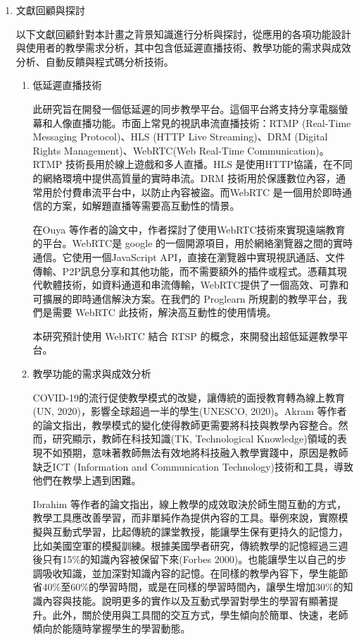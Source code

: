 \documentclass[12pt]{article}
\begin{document}
\begin{enumerate}
  \item 文獻回顧與探討
    \par 以下文獻回顧針對本計畫之背景知識進行分析與探討，從應用的各項功能設計與使用者的教學需求分析，其中包含低延遲直播技術、教學功能的需求與成效分析、自動反饋與程式碼分析技術。
    \begin{enumerate}
      \setlength{\parindent}{2em}
      \item 低延遲直播技術
        \par 此研究旨在開發一個低延遲的同步教學平台。這個平台將支持分享電腦螢幕和人像直播功能。市面上常見的視訊串流直播技術：RTMP (Real-Time Messaging Protocol)、HLS (HTTP Live Streaming)、DRM (Digital Rights Management)、WebRTC(Web Real-Time Communication)。RTMP 技術長用於線上遊戲和多人直播。HLS 是使用HTTP協議，在不同的網絡環境中提供高質量的實時串流。DRM 技術用於保護數位內容，通常用於付費串流平台中，以防止內容被盜。而WebRTC 是一個用於即時通信的方案，如解題直播等需要高互動性的情景。
        \par 在Ouya %
        等作者的論文中\cite{ref13}，作者探討了使用WebRTC技術來實現遠端教育的平台。WebRTC是 google 的一個開源項目，用於網絡瀏覽器之間的實時通信。它使用一個JavaScript API，直接在瀏覽器中實現視訊通話、文件傳輸、P2P訊息分享和其他功能，而不需要額外的插件或程式。憑藉其現代軟體技術，如資料通道和串流傳輸，WebRTC提供了一個高效、可靠和可擴展的即時通信解決方案。在我們的 Proglearn 所規劃的教學平台，我們是需要 WebRTC 此技術，解決高互動性的使用情境。
        \par 本研究預計使用 WebRTC 結合 RTSP 的概念，來開發出超低延遲教學平台。
      \item 教學功能的需求與成效分析
        \par COVID-19的流行促使教學模式的改變，讓傳統的面授教育轉為線上教育(UN, 2020)\cite{ref8}，影響全球超過一半的學生(UNESCO, 2020)\cite{ref9}。Akram %
        等作者的論文\cite{ref15}指出，教學模式的變化使得教師更需要將科技與教學內容整合。然而，研究顯示，教師在科技知識(TK, Technological Knowledge)\cite{ref10}領域的表現不如預期，意味著教師無法有效地將科技融入教學實踐中，原因是教師缺乏ICT (Information and Communication Technology)\cite{ref11}技術和工具，導致他們在教學上遇到困難。
        \par Ibrahim %
        等作者的論文\cite{ref14}指出，線上教學的成效取決於師生間互動的方式，教學工具應改善學習，而非單純作為提供內容的工具。舉例來說，實際模擬與互動式學習，比起傳統的課堂教授，能讓學生保有更持久的記憶力，比如美國空軍的模擬訓練。根據美國學者研究，傳統教學的記憶經過三週後只有15\%的知識內容被保留下來(Forbes 2000)\cite{ref12}。也能讓學生以自己的步調吸收知識，並加深對知識內容的記憶。在同樣的教學內容下，學生能節省40\%至60\%的學習時間，或是在同樣的學習時間內，讓學生增加30\%的知識內容與技能。說明更多的實作以及互動式學習對學生的學習有顯著提升。此外，關於使用與工具間的交互方式，學生傾向於簡單、快速，老師傾向於能隨時掌握學生的學習動態。

\end{enumerate}
\end{enumerate}
\end{document}
